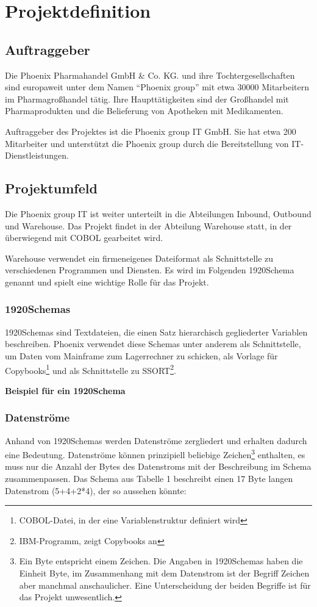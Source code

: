 \section{Projektdefinition}
\label{sec:Einleitung}
\subsection{Auftraggeber}
\label{sec:Auftraggeber}
Die Phoenix Pharmahandel GmbH \& Co. KG. und ihre Tochtergesellschaften sind europaweit unter dem Namen ``Phoenix group'' mit etwa 30000 Mitarbeitern im Pharmagroßhandel tätig. Ihre Haupttätigkeiten sind der Großhandel mit Pharmaprodukten und die Belieferung von Apotheken mit Medikamenten.

Auftraggeber des Projektes ist die Phoenix group IT GmbH. Sie hat etwa 200 Mitarbeiter und unterstützt die Phoenix group durch die Bereitstellung von IT-Dienstleistungen.

\subsection{Projektumfeld} 
\label{sec:Projektumfeld}
Die Phoenix group IT ist weiter unterteilt in die Abteilungen Inbound, Outbound und Warehouse. Das Projekt findet in der Abteilung Warehouse statt, in der überwiegend mit COBOL gearbeitet wird.

Warehouse verwendet ein firmeneigenes Dateiformat als Schnittstelle zu verschiedenen Programmen und Diensten. Es wird im Folgenden 1920Schema genannt und spielt eine wichtige Rolle für das Projekt.

\subsubsection{1920Schemas}
1920Schemas sind Textdateien, die einen Satz hierarchisch gegliederter Variablen beschreiben. Phoenix verwendet diese Schemas unter anderem als Schnittstelle, um Daten vom Mainframe zum Lagerrechner zu schicken, als Vorlage für Copybooks\footnote{COBOL-Datei, in der eine Variablenstruktur definiert wird} und als Schnittstelle zu SSORT\footnote{IBM-Programm, zeigt Copybooks an}.

\textbf{Beispiel für ein 1920Schema}

\subsubsection{Datenströme}
Anhand von 1920Schemas werden Datenströme zergliedert und erhalten dadurch eine Bedeutung. Datenströme können prinzipiell beliebige Zeichen\footnote{Ein Byte entspricht einem Zeichen. Die Angaben in 1920Schemas haben die Einheit Byte, im Zusammenhang mit dem Datenstrom ist der Begriff Zeichen aber manchmal anschaulicher. Eine Unterscheidung der beiden Begriffe ist für das Projekt unwesentlich.} enthalten, es muss nur die Anzahl der Bytes des Datenstroms mit der Beschreibung im Schema zusammenpassen. Das Schema aus Tabelle 1 beschreibt einen 17 Byte langen Datenstrom (5+4+2*4), der so aussehen könnte:

